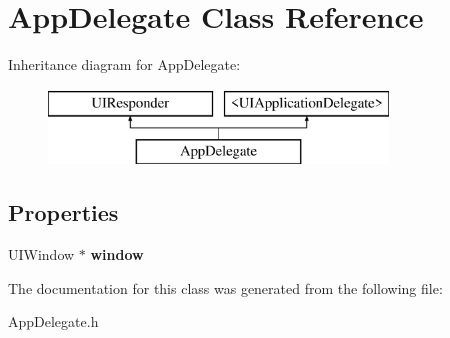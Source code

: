 \hypertarget{interface_app_delegate}{}\section{App\+Delegate Class Reference}
\label{interface_app_delegate}
Inheritance diagram for App\+Delegate\+:\begin{figure}[H]
\begin{center}
\leavevmode
\includegraphics[height=2.000000cm]{interface_app_delegate}
\end{center}
\end{figure}
\subsection*{Properties}
\begin{DoxyCompactItemize}
\item 
U\+I\+Window $\ast$ {\bfseries window}\hypertarget{interface_app_delegate_acf48ac24125e688cac1a85445cd7fac2}{}\label{interface_app_delegate_acf48ac24125e688cac1a85445cd7fac2}

\end{DoxyCompactItemize}


The documentation for this class was generated from the following file\+:\begin{DoxyCompactItemize}
\item 
App\+Delegate.\+h\end{DoxyCompactItemize}

